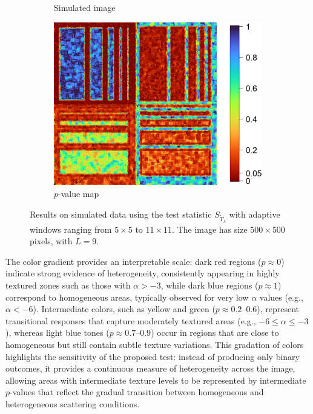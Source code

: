 \documentclass[
  lettersize  journal,
]{IEEEtran}%
\begin{document}
\begin{figure}[hbt]
\begin{subfigure}{0.35\textwidth}
        \caption{Simulated image}
        \label{fig:sim_Phantom_2}
    \end{subfigure}
   \hspace{0.00001\textwidth}
    \begin{subfigure}{0.32\textwidth}
        \includegraphics[width=\linewidth]{./Figures/p-values_tsallis_L9_B200_eta_5_5x11_085_inv.png}
        \caption{$p$-value map  }
        \label{fig:pvalueL9}
    \end{subfigure}
    \caption{Results on simulated data using the test statistic $S_{\widetilde{T}_{\lambda}}$ with adaptive windows ranging from $5\times5$ to $11\times11$. The image has size $500\times500$ pixels, with $L=9$.}

    \label{fig:simL9}
\end{figure}

The color gradient provides an interpretable scale: dark red regions
(\(p \approx 0\)) indicate strong evidence of heterogeneity,
consistently appearing in highly textured zones such as those with
\(\alpha > -3\), while dark blue regions (\(p \approx 1\)) correspond to
homogeneous areas, typically observed for very low \(\alpha\) values
(e.g., \(\alpha < -6\)). Intermediate colors, such as yellow and green
(\(p \approx 0.2\)--\(0.6\)), represent transitional responses that
capture moderately textured areas (e.g., \(-6 \leq \alpha \leq -3\)),
whereas light blue tones (\(p \approx 0.7\)--\(0.9\)) occur in regions
that are close to homogeneous but still contain subtle texture
variations. This gradation of colors highlights the sensitivity of the
proposed test: instead of producing only binary outcomes, it provides a
continuous measure of heterogeneity across the image, allowing areas
with intermediate texture levels to be represented by intermediate
\(p\)-values that reflect the gradual transition between homogeneous and
heterogeneous scattering conditions.
\end{document}
